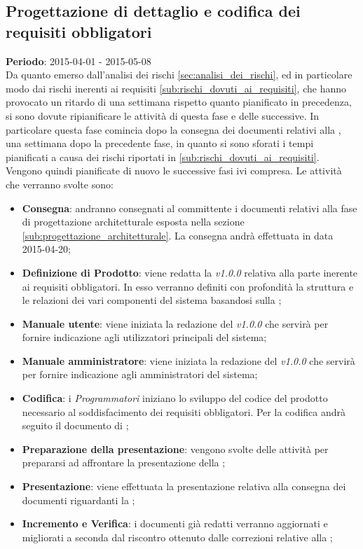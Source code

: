 	\subsection{Progettazione di dettaglio e codifica dei requisiti obbligatori} %
	\label{sub:pianificazione_progettazione_di_dettaglio_e_codifica_dei_requisiti_obbligatori}
	\textbf{Periodo}:  2015-04-01 - 2015-05-08 \\
	Da quanto emerso dall'analisi dei rischi \ref{sec:analisi_dei_rischi}, ed in particolare modo dai rischi inerenti ai requisiti \ref{sub:rischi_dovuti_ai_requisiti}, che hanno provocato un ritardo di una settimana rispetto quanto pianificato in precedenza, si sono dovute ripianificare le attività di questa fase e delle successive. \newline
	In particolare questa fase comincia dopo la consegna dei documenti relativi alla \RPmin, una settimana dopo la precedente fase, in quanto si sono sforati i tempi pianificati a causa dei rischi riportati in \ref{sub:rischi_dovuti_ai_requisiti}. Vengono quindi pianificate di nuovo le successive fasi ivi compresa. \newline
	Le attività che verranno svolte sono:
		\begin{itemize}
			\item \textbf{Consegna}: andranno consegnati al committente i documenti relativi alla fase di progettazione architetturale esposta nella sezione \ref{sub:progettazione_architetturale}. La consegna andrà effettuata in data 2015-04-20;
			\item \textbf{Definizione di Prodotto}: viene redatta la \docNameDdP{} \emph{v1.0.0} relativa alla parte inerente ai requisiti obbligatori. In esso verranno definiti con profondità la struttura e le relazioni dei vari componenti del sistema basandosi sulla \docNameVersionST;
			\item \textbf{Manuale utente}: viene iniziata la redazione del \docNameMU{} \emph{v1.0.0} che servirà per fornire indicazione agli utilizzatori principali del sistema;
			\item \textbf{Manuale amministratore}: viene iniziata la redazione del \docNameMA{} \emph{v1.0.0} che servirà per fornire indicazione agli amministratori del sistema;
			\item \textbf{Codifica}: i \emph{Programmatori} iniziano lo sviluppo del codice del prodotto necessario al soddisfacimento dei requisiti obbligatori. Per la codifica andrà seguito il documento di \docNameVersionDdP;
			\item \textbf{Preparazione della presentazione}: vengono svolte delle attività per prepararsi ad affrontare la presentazione della \RPmin;
			\item \textbf{Presentazione}: viene effettuata la presentazione relativa alla consegna dei documenti riguardanti la \RPmin;

			\item \textbf{Incremento e Verifica}: i documenti già redatti verranno aggiornati e migliorati a seconda dal riscontro ottenuto dalle correzioni relative alla \RPmin;
		\end{itemize}
		
